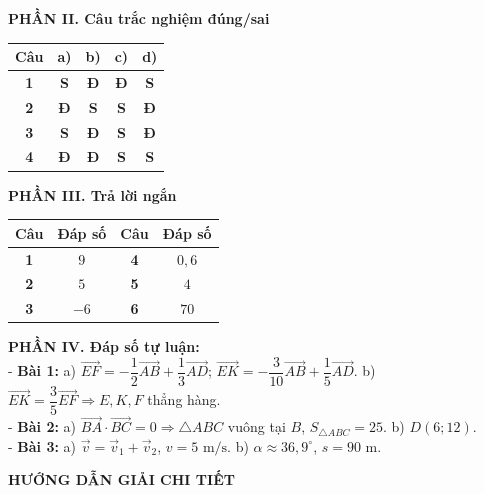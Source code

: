 \documentclass[10pt,a4paper]{article}
\begin{document}
\vspace{1pt}
\noindent\begin{minipage}[t]{0.58\linewidth}
\textbf{PHẦN II. Câu trắc nghiệm đúng/sai}\\[1.5pt]
\renewcommand{\arraystretch}{1.15}
\begin{tabular}{|c|c|c|c|c|}
\hline
\textbf{Câu} & \textbf{a)} & \textbf{b)} & \textbf{c)} & \textbf{d)} \\ \hline
\textbf{1} & \textbf{S} & \textbf{Đ} & \textbf{Đ} & \textbf{S} \\ \hline
\textbf{2} & \textbf{Đ} & \textbf{S} & \textbf{S} & \textbf{Đ} \\ \hline
\textbf{3} & \textbf{S} & \textbf{Đ} & \textbf{S} & \textbf{Đ} \\ \hline
\textbf{4} & \textbf{Đ} & \textbf{Đ} & \textbf{S} & \textbf{S} \\ \hline
\end{tabular}
\end{minipage}\hfill
\begin{minipage}[t]{0.40\linewidth}
\textbf{PHẦN III. Trả lời ngắn}\\[1.5pt]
\renewcommand{\arraystretch}{1.15}
\begin{tabular}{|c|c|c|c|}
\hline
\textbf{Câu} & \textbf{Đáp số} & \textbf{Câu} & \textbf{Đáp số} \\ \hline
\textbf{1} & $9$     & \textbf{4} & $0{,}6$ \\ \hline
\textbf{2} & $5$     & \textbf{5} & $4$ \\ \hline
\textbf{3} & $-6$    & \textbf{6} & $70$ \\ \hline
\end{tabular}
\end{minipage}

\vspace{5pt}
\noindent\textbf{PHẦN IV. Đáp số tự luận:}\\[2pt]
- \textbf{Bài 1:} a) $\vec{EF} = -\dfrac{1}{2}\vec{AB} + \dfrac{1}{3}\vec{AD}$; $\vec{EK} = -\dfrac{3}{10}\vec{AB} + \dfrac{1}{5}\vec{AD}$. b) $\vec{EK} = \dfrac{3}{5}\vec{EF} \Rightarrow E, K, F$ thẳng hàng.\\
- \textbf{Bài 2:} a) $\vec{BA}\cdot\vec{BC} = 0 \Rightarrow \triangle ABC$ vuông tại $B$, $S_{\triangle ABC} = 25$. b) $D(6; 12)$.\\
- \textbf{Bài 3:} a) $\vec{v} = \vec{v}_1 + \vec{v}_2$, $v = 5\text{ m/s}$. b) $\alpha \approx 36{,}9^\circ$, $s = 90\text{ m}$.

\vspace{4pt}
\begin{center}
  {\large\bfseries\color{ink} HƯỚNG DẪN GIẢI CHI TIẾT}
\end{center}
\vspace{1pt}
\end{document}
